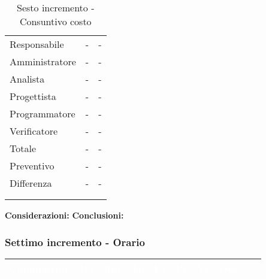{{{\begin{longtable}{C{.4\freewidth} C{.2\freewidth} C{.2\freewidth}}
                Responsabile & - & - \\
                Amministratore & - & - \\
                Analista & - & - \\
                Progettista & - & - \\
                Programmatore & - & - \\
                Verificatore & - &- \\
                Totale & - & - \\
                Preventivo & - & - \\
                Differenza & - & - \\
                \bottomrule
                \\
                \caption{Sesto incremento - Consuntivo costo}
          
                \end{longtable}
                \textbf{Considerazioni:} 
                \textbf{Conclusioni:} 
            }
            \subsubsection{Settimo incremento - Orario} {
                \setlength{\freewidth}{\dimexpr\textwidth-30\tabcolsep}
            \renewcommand{\arraystretch}{1.0}
            \setlength{\aboverulesep}{0pt}
            \setlength{\belowrulesep}{0pt}
            \begin{longtable}{C{.3\freewidth} C{.1\freewidth} C{.1\freewidth} C{.1\freewidth} C{.1\freewidth} C{.1\freewidth} C{.1\freewidth} C{.1\freewidth} C{.1\freewidth} C{.3\freewidth}}
            \toprule
            \textcolor{white}{\textbf{Componente}}&
            \textcolor{white}{\textbf{Re}}&
            \textcolor{white}{\textbf{Am}}&
            \textcolor{white}{\textbf{An}}&
            \textcolor{white}{\textbf{Pt}}&
            \textcolor{white}{\textbf{Pr}}&
            \textcolor{white}{\textbf{Ve}}&
            \textcolor{white}{\textbf{Ore}} \\
            \toprule
            \endhead
    

\end{longtable}}}}
